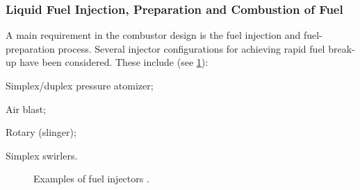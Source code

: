 \subsubsection{Liquid Fuel Injection, Preparation and Combustion of Fuel}
A main requirement in the combustor design is the fuel injection and fuel-preparation process. Several injector configurations for achieving rapid fuel break-up have been considered. These include (see \cref{FIG_INJECTOR}):
\begin{itemizePacked}
\item Simplex/duplex pressure atomizer;
\item Air blast;
\item Rotary (slinger);
\item Simplex swirlers.
\end{itemizePacked}
\begin{figure}[!htb!]
  \begin{center}
  \begin{subfigmatrix}{1}
  \end{subfigmatrix}
  \caption{\label{FIG_INJECTOR}Examples of fuel injectors \cite{LEFEBVRE_BOOK1999}.}
  \end{center}
\end{figure}

